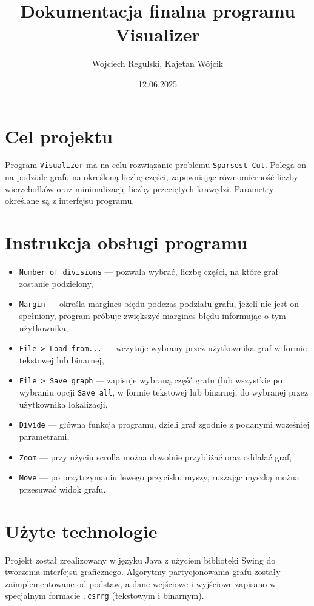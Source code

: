 \documentclass[a4paper,12pt]{article}
\title{Dokumentacja finalna programu Visualizer}
\author{Wojciech Regulski, Kajetan Wójcik}
\date{12.06.2025}
\begin{document}
\maketitle

\tableofcontents
\newpage

\section{Cel projektu}
Program \texttt{Visualizer} ma na celu rozwiązanie problemu \texttt{Sparsest Cut}. Polega on na podziale grafu na określoną liczbę części, zapewniając równomierność liczby wierzchołków oraz minimalizację liczby przeciętych krawędzi. Parametry określane są z interfejsu programu.

\section{Instrukcja obsługi programu}
\begin{itemize}
  \item \texttt{Number of divisions} --- pozwala wybrać, liczbę części, na które graf zostanie podzielony,
  \item \texttt{Margin} --- określa margines błędu podczas podziału grafu, jeżeli nie jest on spełniony, program próbuje zwiększyć margines błędu informując o tym użytkownika,
  \item \texttt{File > Load from...} --- wczytuje wybrany przez użytkownika graf w formie tekstowej lub binarnej,
  \item \texttt{File > Save graph} --- zapisuje wybraną część grafu (lub wszystkie po wybraniu opcji \texttt{Save all}, w formie tekstowej lub binarnej, do wybranej przez użytkownika lokalizacji,
  \item \texttt{Divide} --- główna funkcja programu, dzieli graf zgodnie z podanymi wcześniej parametrami,
  \item \texttt{Zoom} --- przy użyciu scrolla można dowolnie przybliżać oraz oddalać graf,
  \item \texttt{Move} --- po przytrzymaniu lewego przycisku myszy, ruszając myszką można przesuwać widok grafu.
\end{itemize}

\section{Użyte technologie}
Projekt został zrealizowany w języku Java z użyciem biblioteki Swing do tworzenia interfejsu graficznego. Algorytmy partycjonowania grafu zostały zaimplementowane od podstaw, a dane wejściowe i wyjściowe zapisano w specjalnym formacie \texttt{.csrrg} (tekstowym i binarnym).
\end{document}

